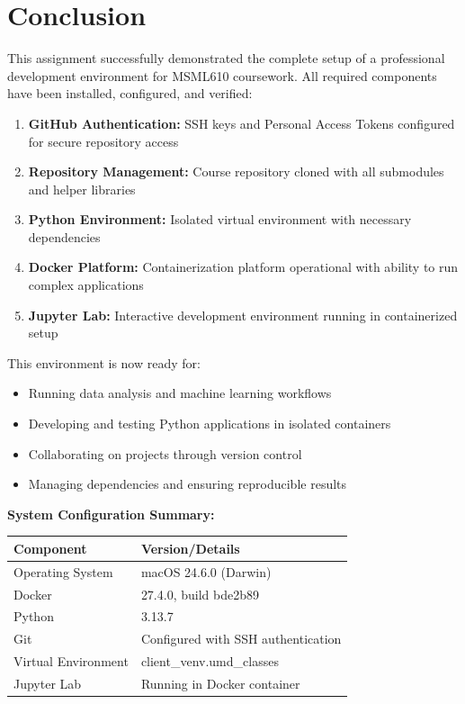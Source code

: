 \documentclass[11pt,letterpaper]{article}
\begin{document}
\newpage

\section*{Conclusion}

This assignment successfully demonstrated the complete setup of a professional development environment for MSML610 coursework. All required components have been installed, configured, and verified:

\begin{enumerate}
    \item \textbf{GitHub Authentication:} SSH keys and Personal Access Tokens configured for secure repository access
    \item \textbf{Repository Management:} Course repository cloned with all submodules and helper libraries
    \item \textbf{Python Environment:} Isolated virtual environment with necessary dependencies
    \item \textbf{Docker Platform:} Containerization platform operational with ability to run complex applications
    \item \textbf{Jupyter Lab:} Interactive development environment running in containerized setup
\end{enumerate}

\vspace{0.5cm}
\noindent This environment is now ready for:
\begin{itemize}
    \item Running data analysis and machine learning workflows
    \item Developing and testing Python applications in isolated containers
    \item Collaborating on projects through version control
    \item Managing dependencies and ensuring reproducible results
\end{itemize}

\vspace{1cm}
\noindent\textbf{System Configuration Summary:}
\begin{table}[H]
\centering
\begin{tabular}{|l|l|}
\hline
\textbf{Component} & \textbf{Version/Details} \\
\hline
Operating System & macOS 24.6.0 (Darwin) \\
Docker & 27.4.0, build bde2b89 \\
Python & 3.13.7 \\
Git & Configured with SSH authentication \\
Virtual Environment & client\_venv.umd\_classes \\
Jupyter Lab & Running in Docker container \\
\hline
\end{tabular}
\end{table}
\end{document}
